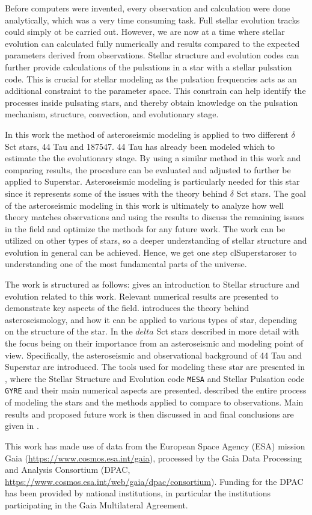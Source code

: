 Before computers were invented, every observation and calculation were done analytically, which was a very time consuming task. Full stellar evolution tracks could simply ot be carried out. However, we are now at a time where stellar evolution can calculated fully numerically and results compared to the expected parameters derived from observations. Stellar structure and evolution codes can further provide calculations of the pulsations in a star with a stellar pulsation code. This is crucial for stellar modeling as the pulsation frequencies acts as an additional constraint to the parameter space. This constrain can help identify the processes inside pulsating stars, and thereby obtain knowledge on the pulsation mechanism, structure, convection, and evolutionary stage. 

In this work the method of asteroseismic modeling is applied to two different $\delta$ Sct stars, 44 Tau and 187547. 44 Tau has already been modeled which to estimate the the evolutionary stage. By using a similar method in this work and comparing results, the procedure can be evaluated and adjusted to further be applied to Superstar. Asteroseismic modeling is particularly needed for this star since it represents some of the issues with the theory behind $\delta$ Sct stars. The goal of the asteroseismic modeling in this work is ultimately to analyze how well theory matches observations and using the results to discuss the remaining issues in the field and optimize the methods for any future work.  The work can be utilized on other types of stars, so a deeper understanding of stellar structure and evolution in general can be achieved. Hence, we get one step clSuperstaroser to understanding one of the most fundamental parts of the universe. 

 The work is structured as follows:  gives an introduction to Stellar structure and evolution related to  this work. Relevant numerical results are presented to demonstrate key aspects of the field.  introduces the theory behind asteroseismology, and how it can be applied to various types of star, depending on the structure of the star. In  the $delta$ Sct stars described in more detail with the focus being on their importance from an asteroseismic and modeling point of view. Specifically, the asteroseismic and observational background of 44 Tau and Superstar are introduced. The tools used for modeling these star are presented in , where the Stellar Structure and Evolution code \texttt{MESA} and Stellar Pulsation code \texttt{GYRE} and their main numerical aspects are presented.  described the entire process of modeling the stars and the methods applied to compare to observations. Main results and proposed future work is then discussed in  and final conclusions are given in .

This work has made use of data from the European Space Agency (ESA) mission
Gaia (\url{https://www.cosmos.esa.int/gaia}), processed by the Gaia Data Processing and Analysis Consortium (DPAC,
\url{https://www.cosmos.esa.int/web/gaia/dpac/consortium}). Funding for the DPAC
has been provided by national institutions, in particular the institutions
participating in the Gaia Multilateral Agreement.
